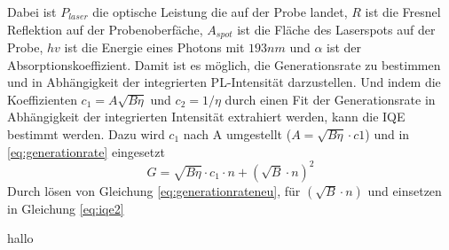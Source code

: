 Dabei ist $P_{laser}$ die optische Leistung die auf der Probe landet, $R$ ist die Fresnel Reflektion auf der Probenoberfäche, $A_{spot}$ ist die Fläche des Laserspots auf der Probe, $h v$ ist die Energie eines Photons mit $193 nm$ und $\alpha$ ist der Absorptionskoeffizient. Damit ist es möglich, die Generationsrate zu bestimmen und in Abhängigkeit der integrierten PL-Intensität darzustellen. Und indem die Koeffizienten $c_1 = A \sqrt{B  \eta}$ und $c_2 = 1 / \eta$ durch einen Fit der Generationsrate in Abhängigkeit der integrierten Intensität extrahiert werden, kann die IQE bestimmt werden. Dazu wird $c_1$ nach A umgestellt ($A = \sqrt{B \eta} \cdot c1$) und in \ref{eq:generationrate} eingesetzt
\begin{equation}
    G = \sqrt{B \eta} \cdot c_1\cdot n + (\sqrt{B} \cdot n)^2
    \label{eq:generationrateneu}
\end{equation}  
Durch lösen von Gleichung \ref{eq:generationrateneu}, für $(\sqrt{B} \cdot n)$ und einsetzen in Gleichung \ref{eq:iqe2}

hallo

